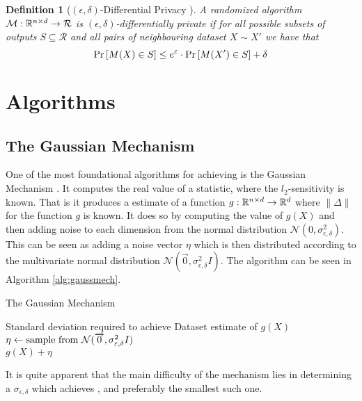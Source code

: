 \documentclass[a4paper,12pt]{article}
\newcommand{\Desc}[2]{\State \makebox[6em][l]{#1}#2}
\newtheorem{definition}{Definition}[section]
\begin{document}
\vspace*{0.3cm}
\begin{definition}[$(\epsilon, \delta)$-Differential Privacy \cite{dwork2016}]
A randomized algorithm $\M: \R^{n \times d} \rightarrow \mathcal{R}$ 
is $(\epsilon, \delta)$-differentially private if for all possible 
subsets of outputs $S \subseteq \mathcal{R}$ and all pairs of 
neighbouring dataset $X \sim X'$ we have that
\[ \prob{M(X) \in S} \le e^{\epsilon} \cdot \prob{M(X') \in S} + \delta \]

    
\end{definition}


\section{Algorithms}
\subsection{The Gaussian Mechanism}
One of the most foundational algorithms for achieving 
\edp is the Gaussian Mechanism \cite{dpbasic}. It computes the real
value of a statistic, where the $l_2$-sensitivity is known.
That is it produces a \edp estimate of a function 
$g: \R^{n \times d} \rightarrow \R^{d}$ where $ \| \Delta \|$ 
for the function $g$ is known.
It does so by computing the value of $g(X)$ and then adding noise
to each dimension from the normal distribution 
$\mathcal{N}(0, \sigma_{\epsilon,\delta}^2)$.
This can be seen as adding a noise vector $\eta$ which 
is then distributed according to
the multivariate normal distribution 
$\mathcal{N}(\overrightarrow{0}, \sigma_{\epsilon,\delta}^2I)$. 
The algorithm can be seen in Algorithm \ref{alg:gaussmech}.

\begin{algorithm}
\caption{The Gaussian Mechanism}\label{alg:gaussmech}
\begin{algorithmic}
    \Input
    \Desc{$\sigma_{\epsilon,\delta}$}{Standard deviation required to achieve \edp}
    \Desc{$X \in \R^{n \times d}$}{Dataset}
    \EndInput
    \Output
    \State\edp estimate of $g(X)$
    \EndOutput
    \State$\eta \gets \textnormal{sample from } \mathcal{N}(\overrightarrow{0}, \sigma_{\epsilon,\delta}^2I)$ \\
    \Return$g(X) + \eta$
\end{algorithmic}
\end{algorithm}
It is quite apparent that the main difficulty of the mechanism 
lies in determining a $\sigma_{\epsilon, \delta}$ which achieves
\edp, and preferably the smallest such one.
\end{document}
